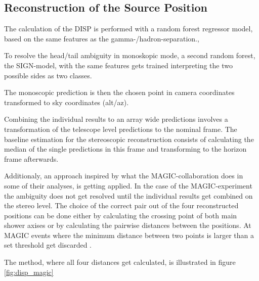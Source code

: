 
\subsection{Reconstruction of the Source Position}
\label{sec:source_position}


The calculation of the DISP is performed with a random
forest regressor model, based on the same features as the gamma-/hadron-separation.,

To resolve the head/tail ambiguity in monoskopic mode,
a second random forest, the SIGN-model, with the same features gets trained
interpreting the two possible sides as two classes.

The monoscopic prediction is then the chosen point in camera coordinates transformed
to sky coordinates (alt/az).

Combining the individual results to an array wide predictions
involves a transformation of the telescope level predictions to
the nominal frame.
The baseline estimation for the stereoscopic reconstruction consists of
calculating the median of the single predictions in this frame and
transforming to the horizon frame afterwards.

Additionaly, an approach inspired by 
what the MAGIC-collaboration does in some of their analyses,
is getting applied.
In the case of the MAGIC-experiment the ambiguity does not
get resolved until the individual results get combined
on the stereo level. The choice of the correct
pair out of the four reconstructed positions can be done either
by calculating the crossing point of both main shower axises
or by calculating the pairwise distances between the positions.
At MAGIC events where the minimum distance between two points is larger than a set threshold
get discarded \cite{ALEKSIC201676}.

The method, where all four distances get calculated, is illustrated in figure \ref{fig:disp_magic}

